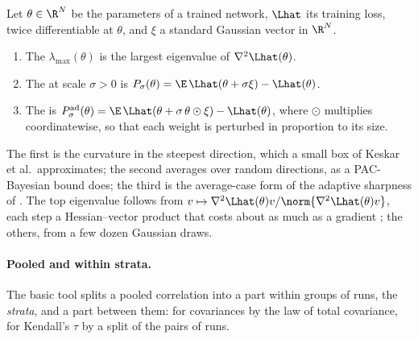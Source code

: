 \begin{refsection}
\begin{definition}\label{def:sharpness:measures}
Let $\theta\in\R^N$ be the parameters of a trained network, $\Lhat$ its training loss, twice differentiable at $\theta$, and $\xi$ a standard Gaussian vector in $\R^N$.
\begin{enumerate}
\item The  $\lambda_{\max}(\theta)$ is the largest eigenvalue of $\nabla^2\Lhat(\theta)$.
\item The  at scale $\sigma>0$ is $P_\sigma(\theta)=\E\,\Lhat(\theta+\sigma\xi)-\Lhat(\theta)$.
\item The  is $P^{\mathrm{ad}}_\sigma(\theta)=\E\,\Lhat(\theta+\sigma\,\theta\odot\xi)-\Lhat(\theta)$, where $\odot$ multiplies coordinatewise, so that each weight is perturbed in proportion to its size.
\end{enumerate}
\end{definition}

The first is the curvature in the steepest direction, which a small box of Keskar et al.\ approximates; the second averages over random directions, as a PAC-Bayesian bound does; the third is the average-case form of the adaptive sharpness of \textcite{KwonEtAl2021}. The top eigenvalue follows from  $v\mapsto\nabla^2\Lhat(\theta)v/\norm{\nabla^2\Lhat(\theta)v}$, each step a Hessian--vector product that costs about as much as a gradient \parencite{Pearlmutter1994}; the others, from a few dozen Gaussian draws.

\paragraph{Pooled and within strata.} The basic tool splits a pooled correlation into a part within groups of runs, the \emph{strata}, and a part between them: for covariances by the law of total covariance, for Kendall's $\tau$ by a split of the pairs of runs.


\end{refsection}
